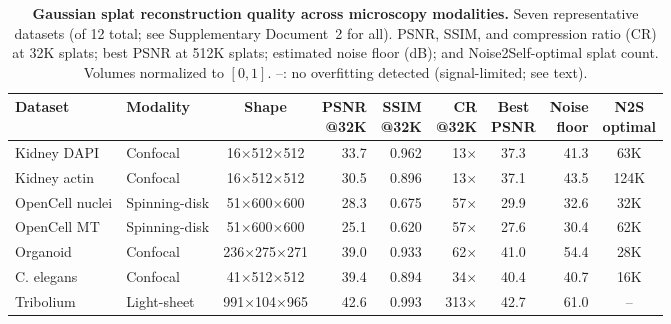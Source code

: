\begin{table}[t]
\centering
\small
\caption{\textbf{Gaussian splat reconstruction quality across microscopy modalities.} Seven representative datasets (of 12 total; see Supplementary Document~2 for all). PSNR, SSIM, and compression ratio (CR) at 32K splats; best PSNR at 512K splats; estimated noise floor (dB); and Noise2Self-optimal splat count. Volumes normalized to $[0, 1]$. --: no overfitting detected (signal-limited; see text).}
\label{tab:summary}
\begin{tabular}{@{}llcrrrcrc@{}}
\toprule
Dataset & Modality & Shape & \makecell{PSNR\\@32K} & \makecell{SSIM\\@32K} & \makecell{CR\\@32K} & \makecell{Best\\PSNR} & \makecell{Noise\\floor} & \makecell{N2S\\optimal} \\
\midrule
  Kidney DAPI\cite{vanderWalt2014scikit} & Confocal & \footnotesize{16$\times$512$\times$512} & 33.7 & 0.962 & 13$\times$ & 37.3 & 41.3 & 63K \\
  Kidney actin\cite{vanderWalt2014scikit} & Confocal & \footnotesize{16$\times$512$\times$512} & 30.5 & 0.896 & 13$\times$ & 37.1 & 43.5 & 124K \\
  OpenCell nuclei\cite{cho2022opencell} & Spinning-disk & \footnotesize{51$\times$600$\times$600} & 28.3 & 0.675 & 57$\times$ & 29.9 & 32.6 & 32K \\
  OpenCell MT\cite{cho2022opencell} & Spinning-disk & \footnotesize{51$\times$600$\times$600} & 25.1 & 0.620 & 57$\times$ & 27.6 & 30.4 & 62K \\
  Organoid\cite{blin2019nessys} & Confocal & \footnotesize{236$\times$275$\times$271} & 39.0 & 0.933 & 62$\times$ & 41.0 & 54.4 & 28K \\
  C. elegans\cite{murray2008celegans} & Confocal & \footnotesize{41$\times$512$\times$512} & 39.4 & 0.894 & 34$\times$ & 40.4 & 40.7 & 16K \\
  Tribolium\cite{preibisch2014efficient} & Light-sheet & \footnotesize{991$\times$104$\times$965} & 42.6 & 0.993 & 313$\times$ & 42.7 & 61.0 & -- \\
\bottomrule
\end{tabular}
\end{table}
